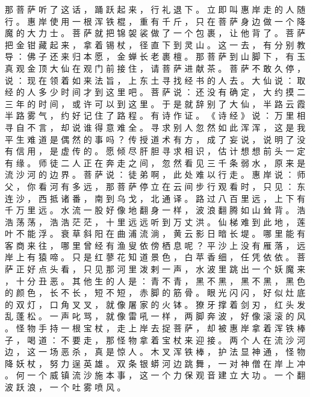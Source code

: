 {那 菩 萨 听 了 这 话 ， 踊 跃 起 来 ， 行 礼 退 下 。
立 即 叫 惠 岸 走 的 人 随 行 。
惠 岸 使 用 一 根 浑 铁 棍 ， 重 有 千 斤 ， 只 在 菩 萨 身 边 做 一 个 降 魔 的 大 力 士 。
菩 萨 就 把 锦 袈 裟 做 了 一 个 包 裹 ， 让 他 背 了 。
菩 萨 把 金 钳 藏 起 来 ， 拿 着 锡 杖 ， 径 直 下 到 灵 山 。
这 一 去 ， 有 分 别 教 导 ： 佛 子 还 来 归 本 愿 ， 金 蝉 长 老 裹 檀 。
那 菩 萨 到 山 脚 下 ， 有 玉 真 观 金 顶 大 仙 在 观 门 前 接 住 ， 请 菩 萨 进 献 茶 。
菩 萨 不 敢 久 停 ， 说 ： 现 在 领 着 如 来 法 旨 ， 上 东 土 寻 找 经 书 的 人 去 。
大 仙 说 ： 取 经 的 人 多 少 时 间 才 到 这 里 吧 。 菩 萨 说 ： 还 没 有 确 定 ， 大 约 摸 二 三 年 的 时 间 ， 或 许 可 以 到 这 里 。
于 是 就 辞 别 了 大 仙 ， 半 路 云 霞 半 路 雾 气 ， 约 好 记 住 了 路 程 。
有 诗 作 证 。
《 诗 经 》 说 ： 万 里 相 寻 自 不 言 ， 却 说 谁 得 意 难 全 。
寻 求 别 人 忽 然 如 此 浑 浑 ， 这 是 我 平 生 难 道 是 偶 然 的 事 吗 ？
传 授 道 术 有 方 ， 成 了 妄 说 ， 说 明 了 没 有 信 用 ， 是 虚 传 的 。
愿 倾 尽 肝 胆 寻 求 相 识 ， 估 计 想 想 前 头 一 定 有 缘 。
师 徒 二 人 正 在 奔 走 之 间 ， 忽 然 看 见 三 千 条 弱 水 ， 原 来 是 流 沙 河 的 边 界 。
菩 萨 说 ： 徒 弟 啊 ， 此 处 难 以 行 走 。
惠 岸 说 ： 师 父 ， 你 看 河 有 多 远 ， 那 菩 萨 停 立 在 云 间 步 行 观 看 时 ， 只 见 ： 东 连 沙 ， 西 抵 诸 番 ， 南 到 乌 戈 ， 北 通 译 。
路 过 八 百 里 远 ， 上 下 有 千 万 里 远 。
水 流 一 股 好 像 地 翻 身 一 样 ， 波 浪 翻 腾 如 山 耸 背 。
浩 浩 荡 荡 ， 浩 浩 茫 茫 ， 十 里 远 远 听 到 万 丈 洪 。
仙 梯 难 到 此 地 ， 莲 叶 不 能 浮 。
衰 草 斜 阳 在 曲 浦 流 淌 ， 黄 云 影 日 暗 长 堤 。
哪 里 能 有 客 商 来 往 ， 哪 里 曾 经 有 渔 叟 依 傍 栖 息 呢 ？ 平 沙 上 没 有 雁 落 ， 远 岸 上 有 猿 啼 。
只 是 红 蓼 花 知 道 景 色 ， 白 苹 香 细 ， 任 凭 依 依 。
菩 萨 正 好 点 头 看 ， 只 见 那 河 里 泼 剌 一 声 ， 水 波 里 跳 出 一 个 妖 魔 来 ， 十 分 丑 恶 。
其 他 生 的 人 是 ： 青 不 青 ， 黑 不 黑 ， 黑 不 黑 ， 黑 色 的 颜 色 ， 长 不 长 ， 短 不 短 ， 赤 脚 的 筋 骨 。
眼 光 闪 闪 ， 好 似 灶 底 的 双 灯 ， 口 角 叉 叉 ， 就 像 屠 家 的 火 钵 。
獠 牙 撑 着 剑 刃 ， 红 头 发 乱 蓬 松 。
一 声 叱 骂 ， 就 像 雷 吼 一 样 ， 两 脚 奔 波 ， 好 像 滚 滚 的 风 。
怪 物 手 持 一 根 宝 杖 ， 走 上 岸 去 捉 菩 萨 ， 却 被 惠 岸 拿 着 浑 铁 棒 子 ， 喝 道 ： 不 要 走 ， 那 怪 物 拿 着 宝 杖 来 迎 接 。
两 个 人 在 流 沙 河 边 ， 这 一 场 恶 杀 ， 真 是 惊 人 。 木 叉 浑 铁 棒 ， 护 法 显 神 通 ， 怪 物 降 妖 杖 ， 努 力 逞 英 雄 。
双 条 银 蟒 河 边 跳 舞 ， 一 对 神 僧 在 岸 上 冲 。
何 一 个 威 镇 流 沙 施 本 事 ， 这 一 个 力 保 观 音 建 立 大 功 。
一 个 翻 波 跃 浪 ， 一 个 吐 雾 喷 风 。
}
